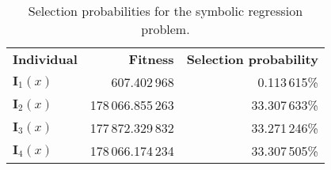 \begin{table}[ht!]
  \centering
  \begin{tabular}{|l|r|r|}
    \textbf{Individual}	& \textbf{Fitness}	& \textbf{Selection probability}	\\
    \(\mathbf{I}_1(x)\)	& 607.402\,968	& 0.113\,615\%	\\
    \(\mathbf{I}_2(x)\)	& 178\,066.855\,263	& 33.307\,633\%	\\
    \(\mathbf{I}_3(x)\)	& 177\,872.329\,832	& 33.271\,246\%	\\
    \(\mathbf{I}_4(x)\)	& 178\,066.174\,234	& 33.307\,505\%	\\
  \end{tabular}
  \caption{Selection probabilities for the symbolic regression problem.}
  \label{tab:bg:gp:sel:prob}
\end{table}